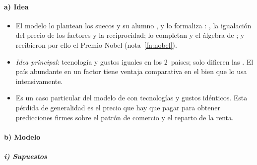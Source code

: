 \documentclass[11pt]{article}
\begin{document}
\paragraph{a) Idea}

\begin{itemize}

\item El modelo lo plantean los suecos \textcite{Heckscher1919Utrikeshandelns} y su alumno \textcite{Ohlin1933Interregional}, y lo formaliza : \textcite{StolperSamuelson1941Protection}, la igualación del precio de los factores\nocite{Samuelson1948International,Samuelson1949International} y la reciprocidad\nocite{Samuelson1953Prices}; lo completan \textcite{Rybczynski1955Factor} y el álgebra de \textcite{Jones1965Structure};  y  recibieron por ello el Premio Nobel (nota~\ref{fn:nobel}).
\item \emph{Idea principal}: tecnología y gustos iguales en los 2~países; solo difieren las . El país abundante en un factor tiene ventaja comparativa en el bien que lo usa intensivamente.
\item Es un caso particular del modelo de  con tecnologías y gustos idénticos. Esta pérdida de generalidad es el precio que hay que pagar para obtener predicciones firmes sobre el patrón de comercio y el reparto de la renta.
\end{itemize}

\paragraph{b) Modelo}

\subparagraph{i) Supuestos}
\end{document}
